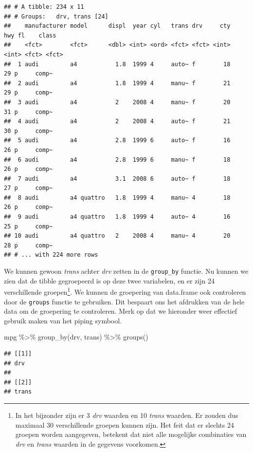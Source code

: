 \documentclass[]{tufte-book}
\newenvironment{Shaded}{}{}
\newcommand{\FunctionTok}[1]{\textcolor[rgb]{0.02,0.16,0.49}{#1}}
\newcommand{\NormalTok}[1]{#1}
\newcommand{\SpecialCharTok}[1]{\textcolor[rgb]{0.25,0.44,0.63}{#1}}
\begin{document}
\begin{verbatim}
## # A tibble: 234 x 11
## # Groups:   drv, trans [24]
##    manufacturer model      displ  year cyl   trans drv     cty   hwy fl    class
##    <fct>        <fct>      <dbl> <int> <ord> <fct> <fct> <int> <int> <fct> <fct>
##  1 audi         a4           1.8  1999 4     auto~ f        18    29 p     comp~
##  2 audi         a4           1.8  1999 4     manu~ f        21    29 p     comp~
##  3 audi         a4           2    2008 4     manu~ f        20    31 p     comp~
##  4 audi         a4           2    2008 4     auto~ f        21    30 p     comp~
##  5 audi         a4           2.8  1999 6     auto~ f        16    26 p     comp~
##  6 audi         a4           2.8  1999 6     manu~ f        18    26 p     comp~
##  7 audi         a4           3.1  2008 6     auto~ f        18    27 p     comp~
##  8 audi         a4 quattro   1.8  1999 4     manu~ 4        18    26 p     comp~
##  9 audi         a4 quattro   1.8  1999 4     auto~ 4        16    25 p     comp~
## 10 audi         a4 quattro   2    2008 4     manu~ 4        20    28 p     comp~
## # ... with 224 more rows
\end{verbatim}

We kunnen gewoon \emph{trans} achter \emph{drv} zetten in de \texttt{group\_by} functie. Nu kunnen we zien dat de tibble gegroepeerd is op deze twee variabelen, en er zijn 24 verschillende groepen\footnote{In het bijzonder zijn er 3 \emph{drv} waarden en 10 \emph{trans} waarden. Er zouden dus maximaal 30 verschillende groepen kunnen zijn. Het feit dat er slechts 24 groepen worden aangegeven, betekent dat niet alle mogelijke combinaties van \emph{drv} en \emph{trans} waarden in de gegevens voorkomen.}. We kunnen de groepering van data.frame ook controleren door de \texttt{groups} functie te gebruiken. Dit bespaart ons het afdrukken van de hele data om de groepering te controleren. Merk op dat we hieronder weer effectief gebruik maken van het piping symbool.

\begin{Shaded}
\begin{Highlighting}[]
\NormalTok{mpg }\SpecialCharTok{\%\textgreater{}\%}
  \FunctionTok{group\_by}\NormalTok{(drv, trans) }\SpecialCharTok{\%\textgreater{}\%}
  \FunctionTok{groups}\NormalTok{()}
\end{Highlighting}
\end{Shaded}

\begin{verbatim}
## [[1]]
## drv
## 
## [[2]]
## trans
\end{verbatim}
\end{document}
